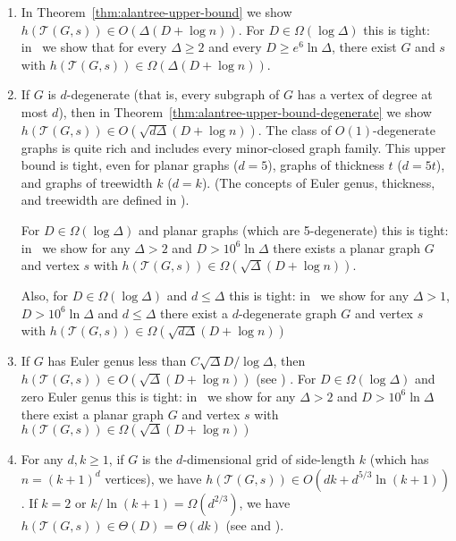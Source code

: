 \documentclass{patmorin}
\newcommand{\tcal}{\mathcal{T}}
\begin{document}

\begin{enumerate}
  \item In Theorem~\ref{thm:alantree-upper-bound} we show $h(\tcal(G,s))\in O(\Delta(D+\log n))$.
  For $D\in \Omega(\log \Delta)$ this is tight: in~ we show that for every $\Delta\ge  2$ and every $D \ge e^6\ln\Delta$, there exist $G$ and $s$ with 
   $h(\tcal(G,s))\in \Omega(\Delta(D+\log n))$.

  \item If $G$ is $d$-degenerate (that is, every subgraph of $G$ has a vertex of degree at most $d$),
  then in Theorem~\ref{thm:alantree-upper-bound-degenerate} we show  $h(\tcal(G,s))\in
    O(\sqrt{d\Delta}(D+\log n))$.  The class of $O(1)$-degenerate
    graphs is quite rich and includes every minor-closed graph family. 
  This upper bound is tight, even for planar graphs ($d=5$), graphs
  of thickness $t$ ($d=5t$), and graphs of treewidth $k$ ($d=k$).
  (The concepts of Euler genus, thickness, and treewidth
    are defined in ).

For $D\in \Omega(\log \Delta)$ and planar graphs (which are 5-degenerate) this is tight:
  in~ we show 
  for any $\Delta>2$ and $D>10^6\ln \Delta$
  there exists a planar graph $G$ and vertex $s$ with
  $h(\tcal(G,s))\in
      \Omega(\sqrt{\Delta}(D+\log n))$.
  
Also, for $D\in \Omega(\log \Delta)$ and $d\leq\Delta$ this is tight:
in~ we show 
for any $\Delta>1$, $D>10^6\ln \Delta$
and $d \leq \Delta$
there exist a $d$-degenerate graph $G$ and vertex $s$ with
$h(\tcal(G,s))\in
    \Omega(\sqrt{d\Delta}(D+\log n))$
    
  \item  If $G$ has Euler genus less than $C\sqrt{\Delta}D/\log\Delta$, then
  $h(\tcal(G,s))\in O(\sqrt{\Delta}(D+\log n))$ 
  (see )  .
  For $D\in \Omega(\log \Delta)$ and zero Euler genus this is tight:
  in~ we show 
  for any $\Delta>2$ and $D>10^6\ln \Delta$
  there exist a planar graph $G$ and vertex $s$ with
  $h(\tcal(G,s))\in
      \Omega(\sqrt{\Delta}(D+\log n))$
  

  \item For any $d,k\geq1$, if $G$ is the $d$-dimensional grid of side-length $k$ (which has
  $n=(k+1)^d$ vertices), we have $h(\tcal(G,s))\in O(dk+d^{5/3}\ln(k+1))$.
  If $k=2$ or $k/\ln(k+1)=\Omega(d^{2/3})$, we have $h(\tcal(G,s))\in \Theta(D)=\Theta(dk)$
  (see  and ).


\end{enumerate}
\end{document}
